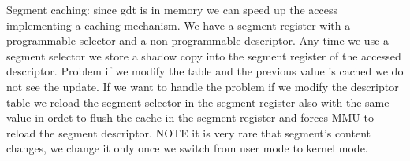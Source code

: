 \documentclass[a4paper,12pt]{article}
\begin{document}
Segment caching: since gdt is in memory we can speed up the access implementing a caching mechanism. We have a segment register with a programmable selector and a non programmable descriptor. Any time we use a segment selector we store a shadow copy into the segment register of the accessed descriptor. Problem if we modify the table and the previous value is cached we do not see the update. If we want to handle the problem if we modify the descriptor table we reload the segment selector in the segment register also with the same value in ordet to flush the cache in the segment register and forces MMU to reload the segment descriptor. NOTE it is very rare that segment's content changes, we change it only once we switch from user mode to kernel mode.
\end{document}
